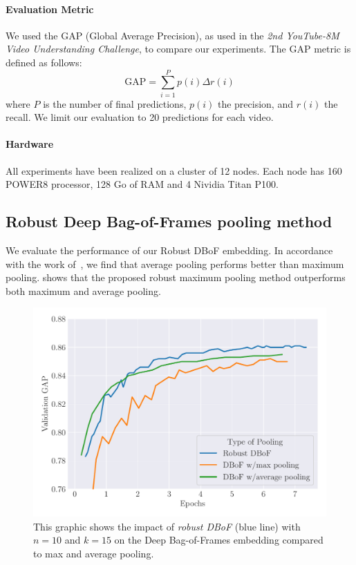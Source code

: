 \paragraph{Evaluation Metric}
We used the GAP (Global Average Precision), as used in the \emph{2nd YouTube-8M Video Understanding Challenge}, to compare our experiments.
The GAP metric is defined as follows:
\begin{equation}
  \text{GAP} = \sum_{i=1}^{P}p(i) \Delta r(i)
\end{equation}
where $P$ is the number of final predictions, $p(i)$ the precision, and $r(i)$ the recall.
We limit our evaluation to 20 predictions for each video. 

\paragraph{Hardware}
All experiments have been realized on a cluster of 12 nodes. Each node has 160 POWER8 processor, 128 Go of RAM and 4 Nividia Titan P100.


\subsection{Robust Deep Bag-of-Frames pooling method}
\label{subsection:ap2-robust_deep_bag-of-frames_pooling_method_experiements}

We evaluate the performance of our Robust DBoF embedding.
In accordance with the work of~\citet{abu2016youtube}, we find that average pooling performs better than maximum pooling. 
 shows that the proposed robust maximum pooling method outperforms both maximum and average pooling.


\begin{figure}[htb]
  \centering
  \includegraphics[width=\scalefigure\textwidth]{figures/appendix/ap2-training_video_classification/graph_robust_dbof.pdf}
  \caption{This graphic shows the impact of \emph{robust DBoF} (\ie blue line) with $n=10$ and $k=15$ on the Deep Bag-of-Frames embedding compared to max and average pooling.}
  \label{figure:ap2-learning_curve_bagging}
\end{figure}



